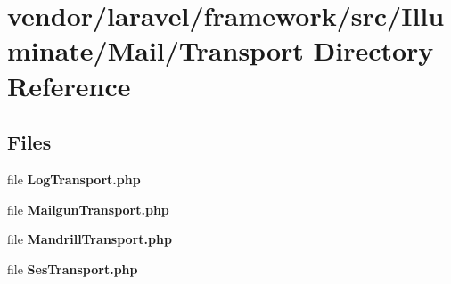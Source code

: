 \section{vendor/laravel/framework/src/\+Illuminate/\+Mail/\+Transport Directory Reference}
\label{dir_1282a444e19ed272c393c5e16f86987b}
\subsection*{Files}
\begin{DoxyCompactItemize}
\item 
file {\bf Log\+Transport.\+php}
\item 
file {\bf Mailgun\+Transport.\+php}
\item 
file {\bf Mandrill\+Transport.\+php}
\item 
file {\bf Ses\+Transport.\+php}
\end{DoxyCompactItemize}
